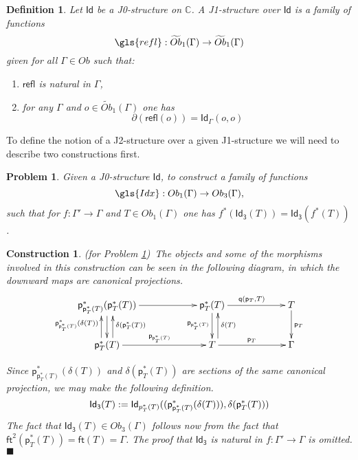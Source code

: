 \documentclass[12pt]{article}
\numberwithin{equation}{section}
\newenvironment{eq}{\begin{equation}}{\end{equation}}
\newtheorem{definition}[proposition]{Definition}
\newtheorem{problem}[proposition]{Problem}
\newtheorem{construction0}[proposition]{Construction}
\newenvironment{construction}[1]{\begin{construction0}(for Problem \ref{#1})\ }{$\blacksquare$ \end{construction0}}
\newcommand{\sr}{\rightarrow}
\newcommand{\wt}{\widetilde}
\newcommand{\CC}{{\mathbb C}}  %
\newcommand{\ft}{\mathsf{ft}}
\newcommand{\p}{\mathsf{p}}
\newcommand{\q}{\mathsf{q}}
\newcommand{\Id}{\mathsf{Id}} %
\newcommand{\Idx}{\mathsf{Id_3}} %
\newcommand{\refl}{\mathsf{refl}}
\newcommand{\Obwt}{\wt{Ob}}
\begin{document}
\begin{definition}
\label{2015.03.27.def2}
Let $\Id$ be a J0-structure on $\CC$. A {\em J1-structure} over $\Id$ is a family of
functions
%
$$\gls{refl}:\Obwt_1(\Gamma)\sr \Obwt_1(\Gamma)$$
%
given for all $\Gamma\in Ob$ such that:
%
\begin{enumerate}
\item $\refl$ is natural in $\Gamma$,
\item for any $\Gamma$ and $o\in \Obwt_1(\Gamma)$ one has 
%
\begin{eq}
\label{2015.03.27.eq8}
\partial(\refl(o))=\Id_\Gamma(o,o)
\end{eq}%
\end{enumerate}
\end{definition}
%
To define the notion of a J2-structure over a given J1-structure we will need
to describe two constructions first.

%
\begin{problem}
\label{2015.03.27.prob1} Given a J0-structure $\Id$, to construct a family of
functions
%
$$\gls{Idx}:Ob_1(\Gamma)\sr Ob_3(\Gamma),$$
%
such that for $f:\Gamma'\sr \Gamma$ and $T\in Ob_1(\Gamma)$ one has
$f^*(\Idx(T))=\Idx(f^*(T))$.
\end{problem}
%
\begin{construction}{2015.03.27.prob1}\label{2015.03.27.constr1}\rm
The objects and some of the morphisms involved
in this construction can be seen in the following diagram, in which the
downward maps are canonical projections.
%
\begin{eq}
  \begin{xy}
    \xymatrix@C=5pc{
      \p_{\p_T^*(T)}^*(\p_T^*(T)) \ar[r] \ar[d]                             &
      \p_T^*(T) \ar[r]^{\q(\p_T,T)} \ar[d]_{\p_{\p_T^*(T)}}                     &
      T \ar[d]^{\p_T}                                                      \\
      \p_T^*(T) \ar[r]^{\p_{\p_T^*(T)}}
                \ar@<-6pt>[u]_{\delta(\p_T^*(T))} 
                \ar@<6pt> [u]^{\p_{\p_T^*(T)}^*(\delta(T))}
                                                                         &
      T \ar[r]^{\p_T} \ar@<-6pt>[u]_{\delta(T)}                             &
      \Gamma
    }
  \end{xy}
\end{eq}%

Since $\p_{\p_T^*(T)}^*(\delta(T))$ and $\delta(\p_T^*(T))$ are sections of the
same canonical projection, we may make the following definition.
\begin{eq}
\label{2015.04.06.eq1}
\Idx(T):=\Id_{\\p_T^*(T)}((\p_{\p_T^*(T)}^*(\delta(T))), \delta(\p_T^*(T)))
\end{eq}%
The fact that $\Idx(T)\in Ob_3(\Gamma)$ follows now from the fact that
$\ft^2(\p_T^*(T))=\ft(T)=\Gamma$.
The proof that $\Idx$ is natural in $f:\Gamma'\sr \Gamma$ is omitted.
\end{construction}
\end{document}
